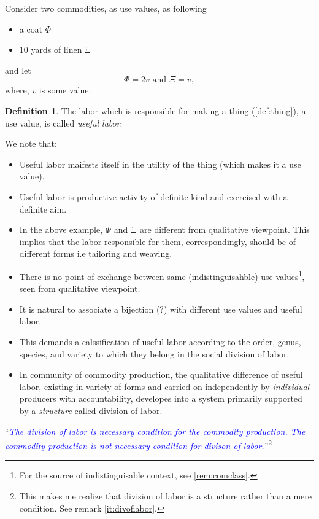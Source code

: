\documentclass[12pt]{extarticle}
\theoremstyle{definition}
\newtheorem{definition}{Definition}[section]
\newenvironment{remark}[1][Remark]{\begin{trivlist}
\item[\hskip \labelsep {\bfseries #1}]}{\end{trivlist}}
\begin{document}
Consider two commodities, as use values, as following
\begin{itemize}
\item a coat $\Phi$
\item 10 yards of linen $\Xi$
\end{itemize}
and let
\begin{equation}
  \Phi = 2v \text{ and } \Xi = v,
\end{equation}
where, $v$ is some value.

\begin{definition}
  \label{def:usefullabor}
  The labor which is responsible for making a thing (\ref{def:thing}), a use value, is called \emph{useful labor}.
\end{definition}

\begin{remark}
  We note that:
  \begin{itemize}
  \item Useful labor maifests itself in the utility of the thing (which makes it a use value).
    \item Useful labor is productive activity of definite kind and exercised with a definite aim.
  \item In the above example, $\Phi$ and $\Xi$ are different from qualitative viewpoint.  This implies that the labor responsible for them, correspondingly, should be of different forms i.e tailoring and weaving.
  \item There is no point of exchange between same (indistinguisahble) use values\footnote{For the source of indistinguisable context, see \ref{rem:comclass}.}, seen from qualitative viewpoint.
  \item It is natural to associate a bijection (?) with different use values and useful labor.
  \item This demands a calssification of useful labor according to the order, genus, species, and variety to which they belong in the social division of labor.
    \item\label{it:divoflabor}  In community of commodity production, the qualitative difference of useful labor, existing in variety of forms and carried on independently by \emph{individual} producers with accountability, developes into a system primarily supported by a \emph{structure} called division of labor.
  \end{itemize}
\end{remark}


``\emph{\textcolor{blue}{The division of labor is necessary condition for the commodity production.  The commodity production is not necessary condition for divison of labor.}}''\footnote{This makes me realize that division of labor is a structure rather than a mere condition.  See remark \ref{it:divoflabor}.}
\end{document}
